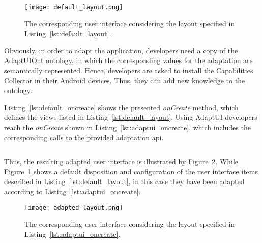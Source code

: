 \inputminted[linenos=true, fontsize=\footnotesize, frame=lines]{xml}{5_experiments_and_results/default_layout.xml}

\inputminted[linenos=true, fontsize=\footnotesize, frame=lines]{java}{5_experiments_and_results/default_oncreate.java}

\begin{figure}
\centering
\texttt{[image: default\_layout.png]}
\caption{The corresponding user interface considering the layout specified in
Listing~\ref{lst:default_layout}.}
\label{fig:default_layout}
\end{figure}

Obviously, in order to adapt the application, developers need a copy of the
AdaptUIOnt ontology, in which the corresponding values for the adaptation are
semantically represented. Hence, developers are asked to install the Capabilities 
Collector in their Android devices. Thus, they can add new knowledge to the ontology.

Listing~\ref{lst:default_oncreate} shows the presented \textit{onCreate} method, 
which defines the views listed in Listing~\ref{lst:default_layout}. Using AdaptUI 
developers reach the \textit{onCreate} shown in Listing~\ref{lst:adaptui_oncreate},
which includes the corresponding calls to the provided adaptation \ac{api}.

\inputminted[linenos=true, fontsize=\footnotesize, frame=lines]{java}{5_experiments_and_results/adaptui_oncreate.java}

Thus, the resulting adapted user interface is illustrated by Figure~\ref{fig:adapted_layout}.
While Figure~\ref{fig:default_layout} shows a default disposition and configuration
of the user interface items described in Listing~\ref{lst:default_layout}, in this
case they have been adapted according to Listing~\ref{lst:adaptui_oncreate}.

\begin{figure}
\centering
\texttt{[image: adapted\_layout.png]}
\caption{The corresponding user interface considering the layout specified in
Listing~\ref{lst:adaptui_oncreate}.}
\label{fig:adapted_layout}
\end{figure}



